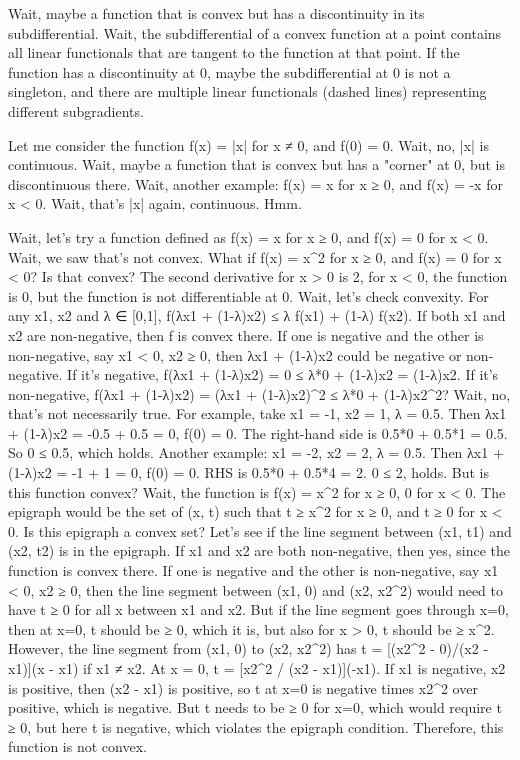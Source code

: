 Wait, maybe a function that is convex but has a discontinuity in its subdifferential. Wait, the subdifferential of a convex function at a point contains all linear functionals that are tangent to the function at that point. If the function has a discontinuity at 0, maybe the subdifferential at 0 is not a singleton, and there are multiple linear functionals (dashed lines) representing different subgradients.

Let me consider the function f(x) = |x| for x ≠ 0, and f(0) = 0. Wait, no, |x| is continuous. Wait, maybe a function that is convex but has a "corner" at 0, but is discontinuous there. Wait, another example: f(x) = x for x ≥ 0, and f(x) = -x for x < 0. Wait, that's |x| again, continuous. Hmm.

Wait, let's try a function defined as f(x) = x for x ≥ 0, and f(x) = 0 for x < 0. Wait, we saw that's not convex. What if f(x) = x^2 for x ≥ 0, and f(x) = 0 for x < 0? Is that convex? The second derivative for x > 0 is 2, for x < 0, the function is 0, but the function is not differentiable at 0. Wait, let's check convexity. For any x1, x2 and λ ∈ [0,1], f(λx1 + (1-λ)x2) ≤ λ f(x1) + (1-λ) f(x2). If both x1 and x2 are non-negative, then f is convex there. If one is negative and the other is non-negative, say x1 < 0, x2 ≥ 0, then λx1 + (1-λ)x2 could be negative or non-negative. If it's negative, f(λx1 + (1-λ)x2) = 0 ≤ λ*0 + (1-λ)x2 = (1-λ)x2. If it's non-negative, f(λx1 + (1-λ)x2) = (λx1 + (1-λ)x2)^2 ≤ λ*0 + (1-λ)x2^2? Wait, no, that's not necessarily true. For example, take x1 = -1, x2 = 1, λ = 0.5. Then λx1 + (1-λ)x2 = -0.5 + 0.5 = 0, f(0) = 0. The right-hand side is 0.5*0 + 0.5*1 = 0.5. So 0 ≤ 0.5, which holds. Another example: x1 = -2, x2 = 2, λ = 0.5. Then λx1 + (1-λ)x2 = -1 + 1 = 0, f(0) = 0. RHS is 0.5*0 + 0.5*4 = 2. 0 ≤ 2, holds. But is this function convex? Wait, the function is f(x) = x^2 for x ≥ 0, 0 for x < 0. The epigraph would be the set of (x, t) such that t ≥ x^2 for x ≥ 0, and t ≥ 0 for x < 0. Is this epigraph a convex set? Let's see if the line segment between (x1, t1) and (x2, t2) is in the epigraph. If x1 and x2 are both non-negative, then yes, since the function is convex there. If one is negative and the other is non-negative, say x1 < 0, x2 ≥ 0, then the line segment between (x1, 0) and (x2, x2^2) would need to have t ≥ 0 for all x between x1 and x2. But if the line segment goes through x=0, then at x=0, t should be ≥ 0, which it is, but also for x > 0, t should be ≥ x^2. However, the line segment from (x1, 0) to (x2, x2^2) has t = [(x2^2 - 0)/(x2 - x1)](x - x1) if x1 ≠ x2. At x = 0, t = [x2^2 / (x2 - x1)](-x1). If x1 is negative, x2 is positive, then (x2 - x1) is positive, so t at x=0 is negative times x2^2 over positive, which is negative. But t needs to be ≥ 0 for x=0, which would require t ≥ 0, but here t is negative, which violates the epigraph condition. Therefore, this function is not convex.

